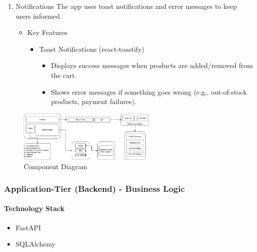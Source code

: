 \documentclass{llncs}
\begin{document}
\begin{enumerate}
    \item Notifications
          The app uses toast notifications and error messages to keep users informed.
          \begin{itemize}
              \item Key Features
                    \begin{itemize}
                        \item Toast Notifications (react-toastify)
                              \begin{itemize}
                                  \item Displays success messages when products are added/removed from the cart.
                                  \item Shows error messages if something goes wrong (e.g., out-of-stock products, payment failures).
                              \end{itemize}
                    \end{itemize}
          \end{itemize}
\end{enumerate}

\begin{figure}[H]
    \centering
    \includegraphics[width=0.6\textwidth]{../diagrams/componant diagram.drawio.png}
    \vspace{0.02\textwidth}
    \caption{Component Diagram}
    \label{fig:component_diagram}
\end{figure}

\subsubsection{Application-Tier (Backend) - Business Logic}
\paragraph{Technology Stack}
\begin{itemize}
    \item FastAPI
    \item SQLAlchemy
\end{itemize}
\end{document}

